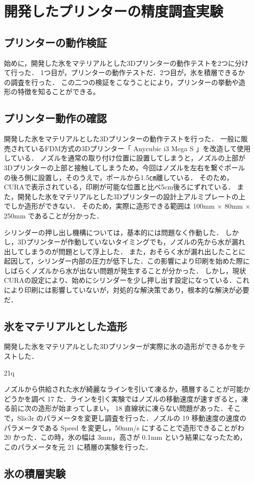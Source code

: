 \chapter{開発したプリンターの精度調査実験}
\label{chp:first}

\section{プリンターの動作検証}
\label{sec:paragraph}
始めに，開発した氷をマテリアルとした3Dプリンターの動作テストを2つに分けて行った．
1つ目が，プリンターの動作テストだ．2つ目が，氷を積層できるかの調査を行った．
この二つの検証をこなうことにより，プリンターの挙動や造形の特徴を知ることができる。

\section{プリンター動作の確認}
\label{sec:paragraph}
開発した氷をマテリアルとした3Dプリンターの動作テストを行った．
一般に販売されているFDM方式の3Dプリンター「 Anycubic i3 Mega S 」を改造して使用している．
ノズルを通常の取り付け位置に設置してしまうと，ノズルの上部が3Dプリンターの上部と接触してしまうため，今回はノズルを左右を繋ぐポールの後ろ側に設置し，そのうえで，ポールから1.5㎝離している．
そのため，CURAで表示されている，印刷が可能な位置と比べ5cm後ろにずれている．
また，開発した氷をマテリアルとした3Dプリンターの設計上アルミプレートの上でしか造形ができない．
そのため，実際に造形できる範囲は 100mm × 80mm × 250mm であることが分かった．

シリンダーの押し出し機構については，基本的には問題なく作動した．
しかし，3Dプリンターが作動していないタイミングでも，ノズルの先から水が漏れ出してしまうのが問題として浮上した．
また，おそらく水が漏れ出したことに起因して，シリンダー内部の圧力が低下した．この影響により印刷を始めた際にしばらくノズルから水が出ない問題が発生することが分かった．
しかし，現状CURAの設定により、始めにシリンダーを少し押し出す設定になっている．これにより印刷には影響していないが，対処的な解決策であり，根本的な解決が必要だ．


\section{氷をマテリアルとした造形}
\label{sec:paragraph}
開発した氷をマテリアルとした3Dプリンターが実際に氷の造形ができるかをテストした．

21q


ノズルから供給された水が綺麗なラインを引いて凍るか，積層することが可能かどうかを調べ
17 た．ラインを引く実験ではノズルの移動速度が速すぎると，凍る前に次の造形が始まってしまい，
18 直線状に凍らない問題があった．そこで，Slic3r のパラメータを変更し調査を行った．ノズルの
19 移動速度の速度のパラメータである Speed を変更し，50mm/s にすることで造形できることがわ
20 かった．この時，氷の幅は 3mm，高さが 0.1mm という結果になったため，このパラメータを元
21 に積層の実験を行った．


\section{氷の積層実験}
\label{sec:paragraph}




